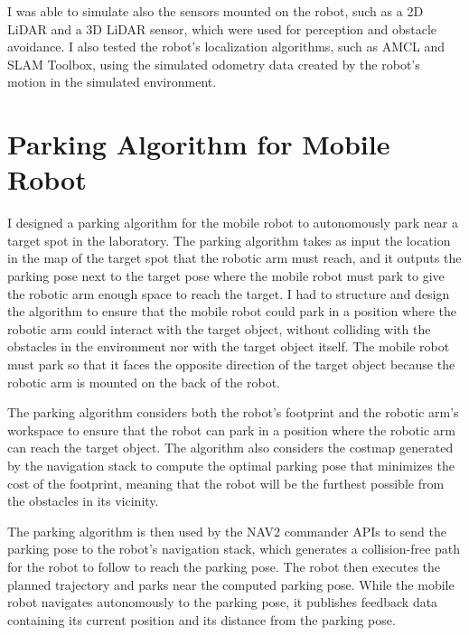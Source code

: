 I was able to simulate also the sensors mounted on the robot, such as a 2D LiDAR and a 3D LiDAR sensor, which were used
for perception and obstacle avoidance. I also tested the robot's localization algorithms, such as AMCL and SLAM Toolbox,
using the simulated odometry data created by the robot's motion in the simulated environment.



\section{Parking Algorithm for Mobile Robot}

I designed a parking algorithm for the mobile robot to autonomously park near a target spot in the laboratory.
The parking algorithm takes as input the location in the map of the target spot that the robotic arm must reach,
and it outputs the parking pose next to the target pose where the mobile robot must park to give the robotic arm
enough space to reach the target. I had to structure and design the algorithm to ensure that the mobile robot
could park in a position where the robotic arm could interact with the target object, without colliding with 
the obstacles in the environment nor with the target object itself. The mobile robot must park so that it 
faces the opposite direction of the target object because the robotic arm is mounted on the back of the robot.

The parking algorithm considers both the robot's footprint and the robotic arm's workspace to ensure that the
robot can park in a position where the robotic arm can reach the target object. 
The algorithm also considers the costmap generated by the navigation stack to compute the optimal parking
pose that minimizes the cost of the footprint, meaning that the robot will be the furthest possible from
the obstacles in its vicinity. 

The parking algorithm is then used by the NAV2 commander APIs to send the parking pose to the robot's navigation stack,
which generates a collision-free path for the robot to follow to reach the parking pose. The robot then executes
the planned trajectory and parks near the computed parking pose. While the mobile robot navigates
autonomously to the parking pose, it publishes feedback data containing its current position and its distance 
from the parking pose. 

